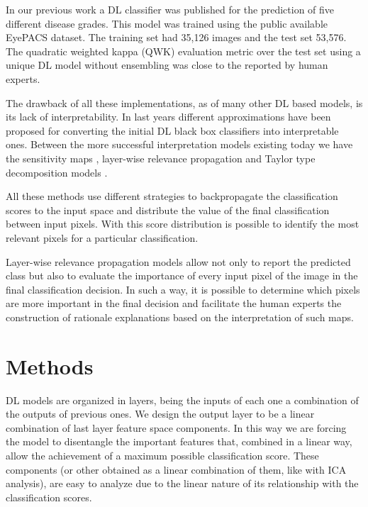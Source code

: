 \documentclass[preprint]{elsarticle}
\theoremstyle{definition} %
\theoremstyle{remark}
\begin{document}
In our previous work \citep{DELATORRE2017} a DL classifier was published for the prediction of five different disease grades. This model was trained using the public available EyePACS dataset. The training set had 35,126 images and the test set 53,576. The quadratic weighted kappa (QWK) evaluation metric \citep{cohen1968weighted} over the test set using a unique DL model without ensembling was close to the reported by human experts. 

The drawback of all these implementations, as of many other DL based models, is its lack of interpretability. In last years different approximations have been proposed for converting the initial DL black box classifiers into interpretable ones. Between the more successful interpretation models existing today we have the sensitivity maps \citep{DBLP:journals/corr/SimonyanVZ13}, layer-wise relevance propagation \citep{bach2015pixel} and Taylor type decomposition models \citep{montavon2017explaining}. %

All these methods use different strategies to backpropagate the classification scores to the input space and distribute the value of the final classification between input pixels. With this score distribution is possible to identify the most relevant pixels for a particular classification. 

Layer-wise relevance propagation models allow not only to report the predicted class but also to evaluate the importance of every input pixel of the image in the final classification decision. In such a way, it is possible to determine which pixels are more important in the final decision and facilitate the human experts the construction of rationale explanations based on the interpretation of such maps. 

\section{Methods}\label{sec:methods}

DL models are organized in layers, being the inputs of each one a combination of the outputs of previous ones. We design the output layer to be a linear combination of last layer feature space components. In this way we are forcing the model to disentangle the important features that, combined in a linear way, allow the achievement of a maximum possible classification score. These components (or other obtained as a linear combination of them, like with ICA analysis), are easy to analyze due to the linear nature of its relationship with the classification scores.
\end{document}
